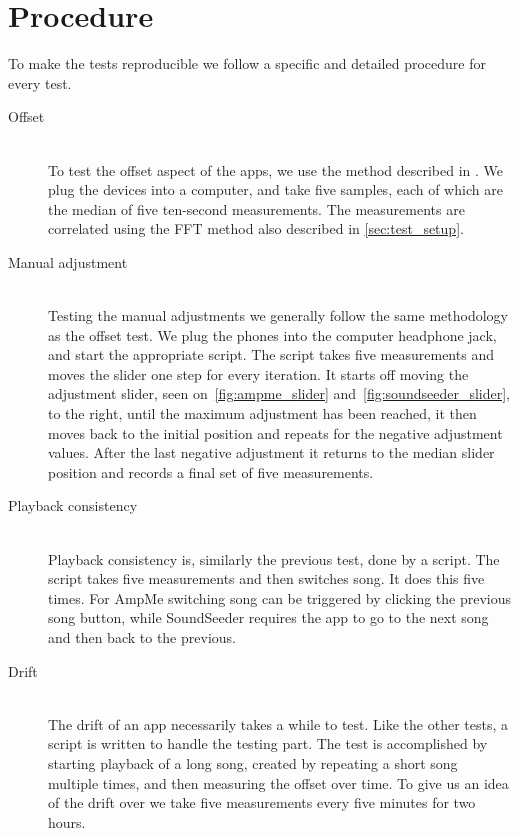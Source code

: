 \section{Procedure}\label{sec:test_procedure}
To make the tests reproducible we follow a specific and detailed
procedure for every test.

\begin{description}
\item[Offset] \hfill\\
To test the offset aspect of the apps, we use the method described in
. We plug the devices into a computer, and take
five samples, each of which are the median of five ten-second measurements. The
measurements are correlated using the \ac{FFT} method also described in
\cref{sec:test_setup}.

\item[Manual adjustment] \hfill\\
Testing the manual adjustments we generally follow the same methodology as
the offset test. We plug the phones into the computer headphone jack,
and start the appropriate script. The script takes five measurements and moves the
slider one step for every iteration. It starts off moving the adjustment
slider, seen on~\vref{fig:ampme_slider} and~\vref{fig:soundseeder_slider}, to the right, until the maximum adjustment has
been reached, it then moves back to the initial position and repeats for
the negative adjustment values. After the last negative adjustment it
returns to the median slider position and records a final set of
five measurements.

\item[Playback consistency] \hfill\\
Playback consistency is, similarly the previous test, done by a script. The
script takes five measurements and then switches song. It does this
five times. For AmpMe switching song can be triggered by clicking the
previous song button, while SoundSeeder requires the app to go to the
next song and then back to the previous.

\item[Drift] \hfill\\
The drift of an app necessarily takes a while to test. Like the other
tests, a script is written to handle the testing part. The test is
accomplished by starting playback of a long song, created by repeating
a short song multiple times, and then measuring the offset over time. To
give us an idea of the drift over we take five measurements every five minutes
for two hours.
\end{description}

